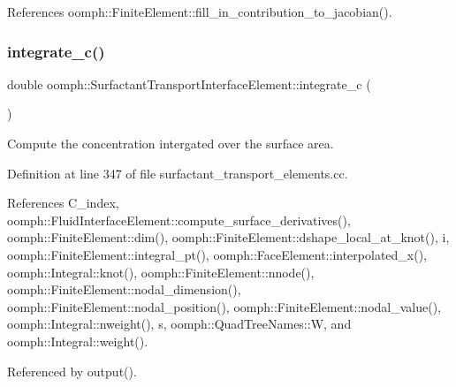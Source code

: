 References oomph\+::\+Finite\+Element\+::fill\+\_\+in\+\_\+contribution\+\_\+to\+\_\+jacobian().

\mbox{\label{classoomph_1_1SurfactantTransportInterfaceElement_a703c35a6da2925926c976957f2da77c4}} 
\subsubsection{\texorpdfstring{integrate\+\_\+c()}{integrate\_c()}}
{\footnotesize\ttfamily double oomph\+::\+Surfactant\+Transport\+Interface\+Element\+::integrate\+\_\+c (\begin{DoxyParamCaption}{ }\end{DoxyParamCaption})}



Compute the concentration intergated over the surface area. 



Definition at line 347 of file surfactant\+\_\+transport\+\_\+elements.\+cc.



References C\+\_\+index, oomph\+::\+Fluid\+Interface\+Element\+::compute\+\_\+surface\+\_\+derivatives(), oomph\+::\+Finite\+Element\+::dim(), oomph\+::\+Finite\+Element\+::dshape\+\_\+local\+\_\+at\+\_\+knot(), i, oomph\+::\+Finite\+Element\+::integral\+\_\+pt(), oomph\+::\+Face\+Element\+::interpolated\+\_\+x(), oomph\+::\+Integral\+::knot(), oomph\+::\+Finite\+Element\+::nnode(), oomph\+::\+Finite\+Element\+::nodal\+\_\+dimension(), oomph\+::\+Finite\+Element\+::nodal\+\_\+position(), oomph\+::\+Finite\+Element\+::nodal\+\_\+value(), oomph\+::\+Integral\+::nweight(), s, oomph\+::\+Quad\+Tree\+Names\+::W, and oomph\+::\+Integral\+::weight().



Referenced by output().

\mbox{\label{classoomph_1_1SurfactantTransportInterfaceElement_a9da12df06b20e5f1ce0736acfc7e8d83}} 

